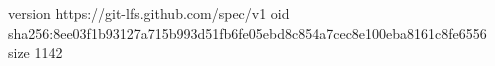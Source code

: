 version https://git-lfs.github.com/spec/v1
oid sha256:8ee03f1b93127a715b993d51fb6fe05ebd8c854a7cec8e100eba8161c8fe6556
size 1142
